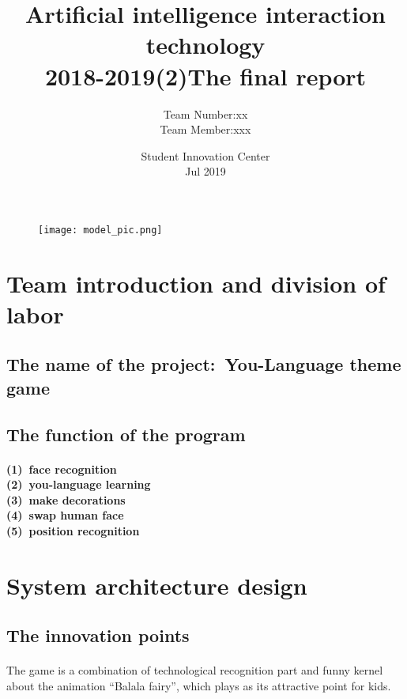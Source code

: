 \documentclass{article}
\title{Artificial intelligence interaction technology\\2018-2019(2)The final report}
\author{Team Number:xx\\Team Member:xxx}
\date{Student Innovation Center\\Jul 2019}
\begin{document}
   \maketitle
   \begin{figure}[ht]
   \centering
    \texttt{[image: model\_pic.png]}
    \end{figure}
   \tableofcontents
   \section{Team introduction and division of labor}
   	\subsection{The name of the project:\ You-Language theme game}
	\subsection{The function of the program}
		\paragraph{(1)\ face recognition\\(2)\ you-language learning\\(3)\ make decorations\\	(4)\ swap human face\\(5)\ position recognition} 
  \section{System architecture design}
   	\subsection{The innovation points}
	\paragraph{}The game is a combination of technological recognition part and funny kernel about the animation “Balala fairy”, which plays as its attractive point for kids. 
\end{document}
